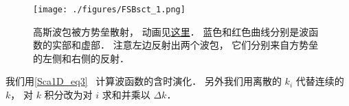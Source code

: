 
\begin{issues}
\issueDraft
\end{issues}


\begin{figure}[ht]
\centering
\texttt{[image: ./figures/FSBsct\_1.png]}
\caption{高斯波包被方势垒散射， 动画见\href{https://wuli.wiki/apps/FSBsct.html}{这里}． 蓝色和红色曲线分别是波函数的实部和虚部． 注意左边反射出两个波包， 它们分别来自方势垒的左侧和右侧的反射．} \label{FSBsct_fig1}
\end{figure}

我们用\autoref{Sca1D_eq3}~ 计算波函数的含时演化． 另外我们用离散的 $k_i$ 代替连续的 $k$， 对 $k$ 积分改为对 $i$ 求和并乘以 $\Delta{k}$．

